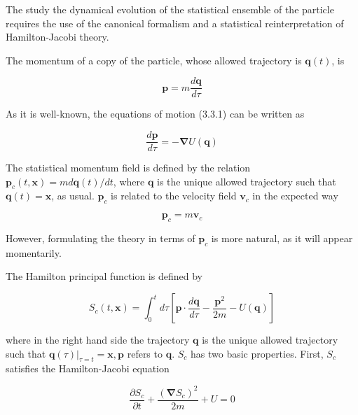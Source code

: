\documentclass{article}
\begin{document}
The study the dynamical evolution of the statistical ensemble of the particle requires the use of the canonical formalism and a statistical reinterpretation of Hamilton-Jacobi theory.

The momentum of a copy of the particle, whose allowed trajectory is $\boldsymbol{q}(t)$, is
 
\begin{equation*}
\boldsymbol{p}=m \frac{d \boldsymbol{q}}{d \tau} \tag{3.3.8}
\end{equation*}
 

As it is well-known, the equations of motion (3.3.1) can be written as
 
\begin{equation*}
\frac{d \boldsymbol{p}}{d \tau}=-\boldsymbol{\nabla} U(\boldsymbol{q}) \tag{3.3.9}
\end{equation*}
 

The statistical momentum field is defined by the relation $\boldsymbol{p}_{c}(t, \boldsymbol{x})=m d \boldsymbol{q}(t) / d t$, where $\boldsymbol{q}$ is the unique allowed trajectory such that $\boldsymbol{q}(t)=\boldsymbol{x}$, as usual. $\boldsymbol{p}_{c}$ is related to the velocity field $\boldsymbol{v}_{c}$ in the expected way
 
\begin{equation*}
\boldsymbol{p}_{c}=m \boldsymbol{v}_{c} \tag{3.3.10}
\end{equation*}
 

However, formulating the theory in terms of $\boldsymbol{p}_{c}$ is more natural, as it will appear momentarily.

The Hamilton principal function is defined by
 
\begin{equation*}
S_{c}(t, \boldsymbol{x})=\int_{0}^{t} d \tau\left[\boldsymbol{p} \cdot \frac{d \boldsymbol{q}}{d \tau}-\frac{\boldsymbol{p}^{2}}{2 m}-U(\boldsymbol{q})\right] \tag{3.3.11}
\end{equation*}
 
where in the right hand side the trajectory $\boldsymbol{q}$ is the unique allowed trajectory such that $\left.\boldsymbol{q}(\tau)\right|_{\tau=t}=\boldsymbol{x}, \boldsymbol{p}$ refers to $\boldsymbol{q}$. $S_{c}$ has two basic properties. First, $S_{c}$ satisfies the Hamilton-Jacobi equation
 
\begin{equation*}
\frac{\partial S_{c}}{\partial t}+\frac{\left(\boldsymbol{\nabla} S_{c}\right)^{2}}{2 m}+U=0 \tag{3.3.12}
\end{equation*}
 
\end{document}
